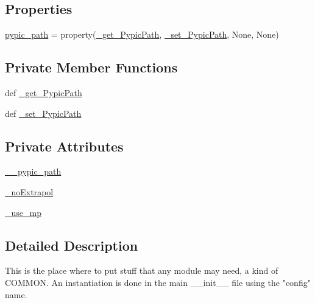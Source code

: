 \subsection*{Properties}
\begin{DoxyCompactItemize}
\item 
\hyperlink{classpyneb_1_1utils_1_1_config_1_1___config_a5276927da3588ffb009fd79f282c6d3c}{pypic\-\_\-path} = property(\hyperlink{classpyneb_1_1utils_1_1_config_1_1___config_a7767dbcdc10faca7e175f2778970a416}{\-\_\-get\-\_\-\-Pypic\-Path}, \hyperlink{classpyneb_1_1utils_1_1_config_1_1___config_a22c1c7d1ad66fdcaa91092721438e19e}{\-\_\-set\-\_\-\-Pypic\-Path}, None, None)
\end{DoxyCompactItemize}
\subsection*{Private Member Functions}
\begin{DoxyCompactItemize}
\item 
def \hyperlink{classpyneb_1_1utils_1_1_config_1_1___config_a7767dbcdc10faca7e175f2778970a416}{\-\_\-get\-\_\-\-Pypic\-Path}
\item 
def \hyperlink{classpyneb_1_1utils_1_1_config_1_1___config_a22c1c7d1ad66fdcaa91092721438e19e}{\-\_\-set\-\_\-\-Pypic\-Path}
\end{DoxyCompactItemize}
\subsection*{Private Attributes}
\begin{DoxyCompactItemize}
\item 
\hyperlink{classpyneb_1_1utils_1_1_config_1_1___config_a1c122165aa8885ce11f9bf86d08c40cd}{\-\_\-\-\_\-pypic\-\_\-path}
\item 
\hyperlink{classpyneb_1_1utils_1_1_config_1_1___config_a0fd9f60b73f8af4fda56fed8c6683a1c}{\-\_\-no\-Extrapol}
\item 
\hyperlink{classpyneb_1_1utils_1_1_config_1_1___config_a29aefac8a5bc01cb564c9fc12755fe7c}{\-\_\-use\-\_\-mp}
\end{DoxyCompactItemize}


\subsection{Detailed Description}
\begin{DoxyVerb}This is the place where to put stuff that any module may need, a kind of COMMON.
An instantiation is done in the main __init__ file using the "config" name.\end{DoxyVerb}
 

